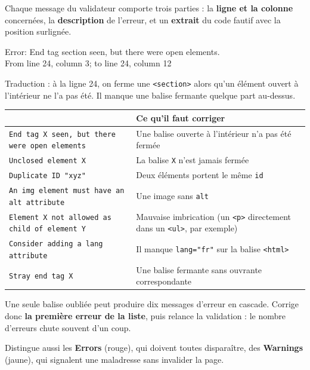 \documentclass[a4paper,11pt]{article}
\newcommand{\hdr}[1]{\multicolumn{1}{l}{\color{white}\bfseries #1}}
\renewcommand{\arraystretch}{1.3}
\begin{document}
Chaque message du validateur comporte trois parties : la \textbf{ligne et la colonne} concernées, la \textbf{description} de l'erreur, et un \textbf{extrait} du code fautif avec la position surlignée.

\begin{tcolorbox}[corrige, title={Exemple de message}]
\ttfamily\small
Error: End tag \textcolor{alertRed}{section} seen, but there were open elements.\\
From line 24, column 3; to line 24, column 12
\end{tcolorbox}

\vspace{4pt}
Traduction : à la ligne 24, on ferme une \texttt{<section>} alors qu'un élément ouvert à l'intérieur ne l'a pas été. Il manque une balise fermante quelque part au-dessus.

\begin{center}
\renewcommand{\arraystretch}{1.0}
\begin{tabularx}{\linewidth}{p{5.4cm}X}
  \toprule
  \rowcolor{uniNavy}
  \hdr{Message fréquent} & \hdr{Ce qu'il faut corriger} \\
  \midrule
  \rowcolor{uniPaper}
  \texttt{End tag X seen, but there were open elements} & Une balise ouverte à l'intérieur n'a pas été fermée \\
  \texttt{Unclosed element X} & La balise \texttt{X} n'est jamais fermée \\
  \rowcolor{uniPaper}
  \texttt{Duplicate ID "xyz"} & Deux éléments portent le même \texttt{id} \\
  \texttt{An img element must have an alt attribute} & Une image sans \texttt{alt} \\
  \rowcolor{uniPaper}
  \texttt{Element X not allowed as child of element Y} & Mauvaise imbrication (un \texttt{<p>} directement dans un \texttt{<ul>}, par exemple) \\
  \texttt{Consider adding a lang attribute} & Il manque \texttt{lang="fr"} sur la balise \texttt{<html>} \\
  \rowcolor{uniPaper}
  \texttt{Stray end tag X} & Une balise fermante sans ouvrante correspondante \\
  \bottomrule
\end{tabularx}
\end{center}

\begin{tcolorbox}[astuce, title={Méthode --- corriger de haut en bas}]
Une seule balise oubliée peut produire dix messages d'erreur en cascade. Corrige donc \textbf{la première erreur de la liste}, puis relance la validation : le nombre d'erreurs chute souvent d'un coup.

\vspace{3pt}
Distingue aussi les \textbf{Errors} (rouge), qui doivent toutes disparaître, des \textbf{Warnings} (jaune), qui signalent une maladresse sans invalider la page.
\end{tcolorbox}
\end{document}
